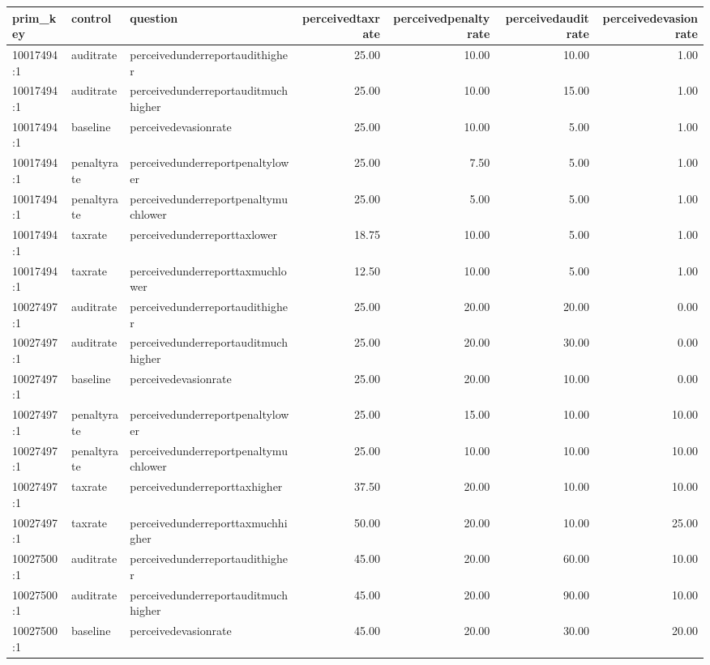 \begin{table}[ht]
\centering
\begin{tabular}{lllrrrr}
  \hline
prim\_key & control & question & perceivedtaxrate & perceivedpenaltyrate & perceivedauditrate & perceivedevasionrate \\ 
  \hline
10017494:1 & auditrate & perceivedunderreportaudithigher & 25.00 & 10.00 & 10.00 & 1.00 \\ 
  10017494:1 & auditrate & perceivedunderreportauditmuchhigher & 25.00 & 10.00 & 15.00 & 1.00 \\ 
  10017494:1 & baseline & perceivedevasionrate & 25.00 & 10.00 & 5.00 & 1.00 \\ 
  10017494:1 & penaltyrate & perceivedunderreportpenaltylower & 25.00 & 7.50 & 5.00 & 1.00 \\ 
  10017494:1 & penaltyrate & perceivedunderreportpenaltymuchlower & 25.00 & 5.00 & 5.00 & 1.00 \\ 
  10017494:1 & taxrate & perceivedunderreporttaxlower & 18.75 & 10.00 & 5.00 & 1.00 \\ 
  10017494:1 & taxrate & perceivedunderreporttaxmuchlower & 12.50 & 10.00 & 5.00 & 1.00 \\ 
  10027497:1 & auditrate & perceivedunderreportaudithigher & 25.00 & 20.00 & 20.00 & 0.00 \\ 
  10027497:1 & auditrate & perceivedunderreportauditmuchhigher & 25.00 & 20.00 & 30.00 & 0.00 \\ 
  10027497:1 & baseline & perceivedevasionrate & 25.00 & 20.00 & 10.00 & 0.00 \\ 
  10027497:1 & penaltyrate & perceivedunderreportpenaltylower & 25.00 & 15.00 & 10.00 & 10.00 \\ 
  10027497:1 & penaltyrate & perceivedunderreportpenaltymuchlower & 25.00 & 10.00 & 10.00 & 10.00 \\ 
  10027497:1 & taxrate & perceivedunderreporttaxhigher & 37.50 & 20.00 & 10.00 & 10.00 \\ 
  10027497:1 & taxrate & perceivedunderreporttaxmuchhigher & 50.00 & 20.00 & 10.00 & 25.00 \\ 
  10027500:1 & auditrate & perceivedunderreportaudithigher & 45.00 & 20.00 & 60.00 & 10.00 \\ 
  10027500:1 & auditrate & perceivedunderreportauditmuchhigher & 45.00 & 20.00 & 90.00 & 10.00 \\ 
  10027500:1 & baseline & perceivedevasionrate & 45.00 & 20.00 & 30.00 & 20.00 \\ 

\end{tabular}
\end{table}

